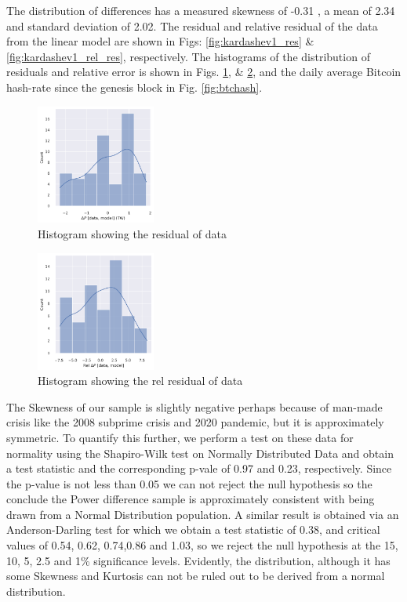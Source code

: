 \documentclass[final,5p,times,twocolumn,authoryear]{elsarticle}
\begin{document}
The distribution of differences has a measured skewness of -0.31 \cite{zw00}, a mean of 2.34 and standard deviation of 2.02. The residual and relative residual of the data from the linear model are shown in Figs: \ref{fig:kardashev1_res} \& \ref{fig:kardashev1_rel_res}, respectively. The histograms of the distribution of residuals and relative error is shown in Figs. \ref{fig:his_res}, \& \ref{fig:his_rel_res}, and the daily average Bitcoin hash-rate since the genesis block in Fig. \ref{fig:btchash}.



\begin{figure}
    \centering
    \includegraphics[width=0.35\textwidth]{figs/P_residual.png}
    \vspace*{-0.3cm}
    \caption{Histogram showing the residual of data}
    \label{fig:his_res}
\end{figure}

\begin{figure}
    \centering
    \includegraphics[width=0.35\textwidth]{figs/P_rel_residual.png}
    \vspace*{-0.3cm}
    \caption{Histogram showing the rel residual of data}
    \label{fig:his_rel_res}
\end{figure}


The Skewness of our sample is slightly negative perhaps because of man-made crisis like the 2008 subprime crisis and 2020 pandemic, but it is approximately symmetric. To quantify this further, we perform a test on these data for normality using the Shapiro-Wilk test on Normally Distributed Data and obtain a test statistic and the corresponding p-vale of 0.97 and 0.23, respectively. Since the p-value is not less than 0.05 we can not reject the null hypothesis so the conclude the Power difference sample is approximately consistent with being drawn from a Normal Distribution population. A similar result is obtained via an Anderson-Darling test for which we obtain a test statistic of 0.38, and critical values of 0.54, 0.62, 0.74,0.86 and 1.03, so we reject the null hypothesis at the 15, 10, 5, 2.5 and 1\% significance levels. Evidently, the distribution, although it has some Skewness and Kurtosis can not be ruled out to be derived from a normal distribution.
\end{document}
